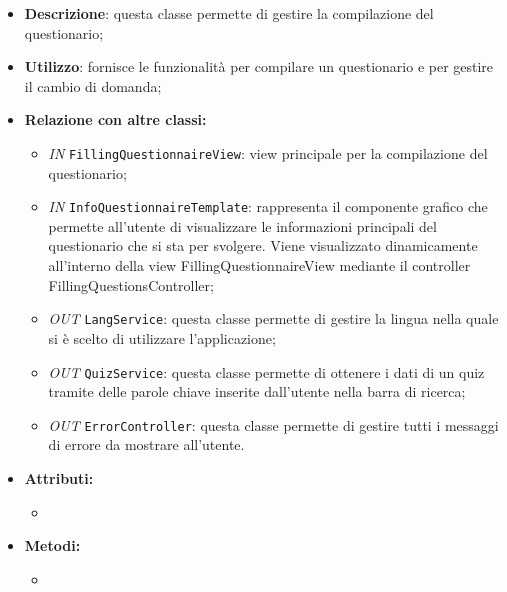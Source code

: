 \begin{itemize}
	\item \textbf{Descrizione}: questa classe permette di gestire la compilazione del questionario;
	\item \textbf{Utilizzo}: fornisce le funzionalità per compilare un questionario e per gestire il cambio di domanda;
	\item \textbf{Relazione con altre classi:}
	\begin{itemize}
		\item \textit{IN} \texttt{FillingQuestionnaireView}: view principale per la compilazione del questionario;  
		\item \textit{IN} \texttt{InfoQuestionnaireTemplate}: rappresenta il componente grafico che permette all'utente di visualizzare le informazioni principali del questionario che si sta per svolgere. Viene visualizzato dinamicamente all'interno della view FillingQuestionnaireView mediante il controller FillingQuestionsController;
		\item \textit{OUT} \texttt{LangService}: questa classe permette di gestire la lingua nella quale si è scelto di utilizzare l'applicazione;
		\item \textit{OUT} \texttt{QuizService}: questa classe permette di ottenere i dati di un quiz tramite delle parole chiave inserite dall'utente nella barra di ricerca;
		\item \textit{OUT} \texttt{ErrorController}: questa classe permette di gestire tutti i messaggi di errore da mostrare all'utente.
	\end{itemize}
	\item \textbf{Attributi:}
	\begin{itemize}
		\item 
	\end{itemize}
	\item \textbf{Metodi:}
	\begin{itemize}
		\item 
	\end{itemize}
\end{itemize}

